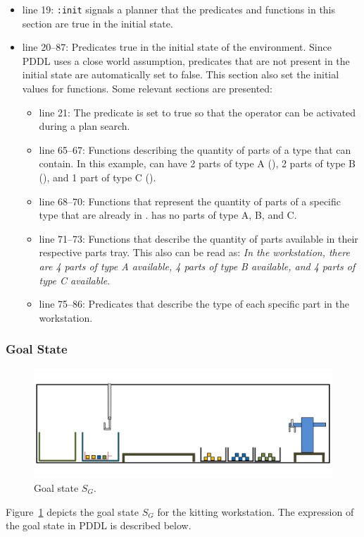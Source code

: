 \begin{itemize}
\item line 19: \texttt{:init} signals a planner that the predicates and functions in this section are true in the initial state.
\item line 20--87: Predicates true in the initial state of the environment. Since PDDL uses a close world assumption, predicates that are not present in the initial state are automatically set to false. This section also set the initial values for functions. Some relevant sections are presented:
\begin{itemize}
\item line 21: The predicate  is set to true so that the operator  can be activated during a plan search.
\item line 65--67: Functions describing the quantity of parts of a type that  can contain. In this example,  can have 2 parts of type A (), 2 parts of type B (), and 1 part of type C ().
\item line 68--70: Functions that represent the quantity of parts of a specific type that are already in .  has no parts of type A, B, and C.
\item line 71--73: Functions that describe the quantity of parts available in their respective parts tray. This also can be read as: \emph{In the workstation, there are 4 parts of type A available, 4 parts of type B available, and 4 parts of type C available}.
\item line 75--86: Predicates that describe the type of each specific part in the workstation.
\end{itemize}
\end{itemize}

\subsubsection{Goal State}
\begin{figure}[h!t!]
\centering
\includegraphics[width=14cm]{Figure/sfinal.jpg}
\caption{Goal state $S_G$.}
\label{fig:sf}
\end{figure}
Figure~\ref{fig:sf} depicts the goal state $S_G$ for the kitting workstation. The expression of the goal state in PDDL is described below.


